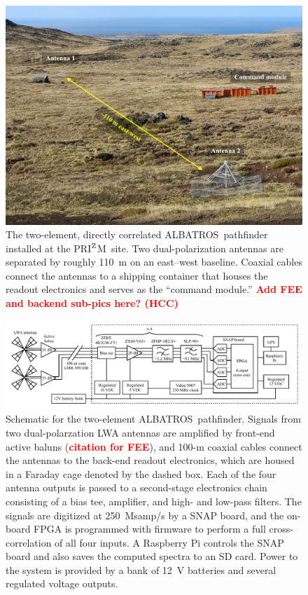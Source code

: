 \documentclass{ws-jai}
\def\albatros{ALBATROS}
\def\prizm{PRI$^{\rm Z}$M}
\begin{document}
\begin{figure}
  \begin{center}
    \includegraphics[width=0.7\linewidth]{Figures/albatros_2elem/albatros_2elem.pdf}
    \caption{The two-element, directly correlated
      \albatros\ pathfinder installed at the \prizm\ site.  Two
      dual-polarization antennas are separated by roughly 110~m on an
      east--west baseline. Coaxial cables connect the antennas to a
      shipping container that houses the readout electronics and
      serves as the ``command module.'' \textcolor{red}{\bf Add FEE
        and backend sub-pics here? (HCC)}}
    \label{Fig:albatros2}
  \end{center}
\end{figure}

\begin{figure}
  \begin{center}
    \includegraphics[width=1.0\linewidth]{Figures/albatros_2elem_schematic/albatros_2elem_schematic.pdf}
    \caption{Schematic for the two-element \albatros\ pathfinder.
      Signals from two dual-polarzation LWA antennas are amplified by
      front-end active baluns (\textcolor{red}{\bf citation for FEE}),
      and 100-m coaxial cables connect the antennas to the back-end
      readout electronics, which are housed in a Faraday cage denoted
      by the dashed box.  Each of the four antenna outputs is passed
      to a second-stage electronics chain consisting of a bias tee,
      amplifier, and high- and low-pass filters.  The signals are
      digitized at 250~Msamp/s by a SNAP board, and the on-board FPGA
      is programmed with firmware to perform a full cross-correlation
      of all four inputs.  A Raspberry Pi controls the SNAP board and
      also saves the computed spectra to an SD card.  Power to the
      system is provided by a bank of 12~V batteries and several
      regulated voltage outputs.}
    \label{Fig:albatros2_schem}
  \end{center}
\end{figure}
\end{document}
